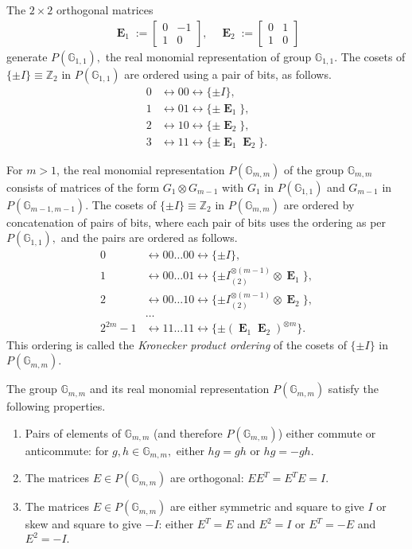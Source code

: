 \documentclass[12pt,a4paper]{article}
\newcommand{\mb}[1]{\mathbb{#1}}
\newcommand{\mf}[1]{\mathbf{#1}}
\newcommand{\oE}{\mf{\operatorname{E}}}
\newcommand{\G}{\mb{G}}
\newcommand{\Z}{\mb{Z}}
\newcommand{\Rep}{P}
\begin{document}
The $2 \times 2$ orthogonal matrices
\begin{align*}
\oE_1 :=
\left[
\begin{array}{cc}
0 & -1 \\
1 & 0
\end{array}
\right],
\quad
\oE_2 :=
\left[
\begin{array}{cc}
0 & 1 \\
1 & 0
\end{array}
\right]
\end{align*}
generate $\Rep(\G_{1,1}),$ the real monomial representation of group $\G_{1,1}.$
The cosets of $\{\pm I\} \equiv \Z_2$ in $\Rep(\G_{1,1})$ are
ordered using a pair of bits, as follows.
\begin{align*}
0 &\leftrightarrow 00 \leftrightarrow \{ \pm I \},
\\
1 &\leftrightarrow 01 \leftrightarrow \{ \pm \oE_1 \},
\\
2 &\leftrightarrow 10 \leftrightarrow \{ \pm \oE_2 \},
\\
3 &\leftrightarrow 11 \leftrightarrow \{ \pm \oE_1 \oE_2 \}.
\end{align*}

For $m > 1$,
the real monomial representation $\Rep(\G_{m,m})$ of the 
group $\G_{m,m}$ consists of matrices of the form $G_1 \otimes G_{m-1}$
with $G_1$ in $\Rep(\G_{1,1})$ and $G_{m-1}$ in $\Rep(\G_{m-1,m-1}).$
The cosets of $\{\pm I\} \equiv \Z_2$ in $\Rep(\G_{m,m})$ are
ordered by concatenation of pairs of bits, 
where each pair of bits uses the ordering as per $\Rep(\G_{1,1}),$
and the pairs are ordered as follows.
\begin{align*}
0 &\leftrightarrow 00 \ldots 00 \leftrightarrow \{ \pm I \},
\\
1 &\leftrightarrow 00 \ldots 01 \leftrightarrow \{ \pm I_{(2)}^{\otimes {(m-1)}} \otimes  \oE_1 \},
\\
2 &\leftrightarrow 00 \ldots 10 \leftrightarrow \{ \pm I_{(2)}^{\otimes {(m-1)}} \otimes  \oE_2 \},
\\
&\ldots
\\
2^{2m} - 1 &\leftrightarrow 11 \ldots 11 \leftrightarrow \{ \pm (\oE_1 \oE_2)^{\otimes {m}} \}.
\end{align*}
This ordering is called 
the \emph{Kronecker product ordering} of the cosets of $\{\pm I\}$ in $\Rep(\G_{m,m}).$

The group $\G_{m,m}$ and its real monomial representation $\Rep(\G_{m,m})$ 
satisfy the following properties.
\begin{enumerate}
\item 
Pairs of elements of $\G_{m,m}$ (and therefore $\Rep(\G_{m,m})$) either commute or anti\-commute:
for $g, h \in \G_{m,m},$ either $h g = g h$ or $h g = - g h.$
\item
The matrices $E \in \Rep(\G_{m,m})$ are orthogonal: $E E^T = E^T E = I.$
\item
The matrices $E \in \Rep(\G_{m,m})$ are either symmetric and square to give $I$ or 
skew and square to give $-I$: either $E^T = E$ and $E^2 =I$ or $E^T = -E$ and $E^2 = -I.$
\end{enumerate}
\end{document}
